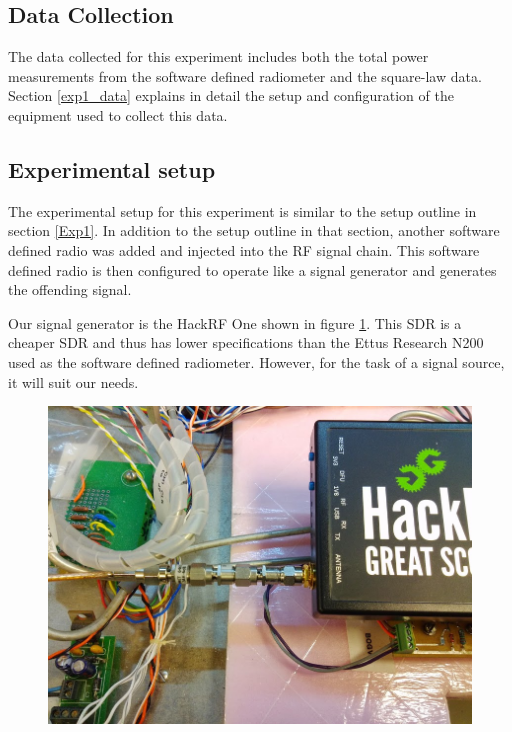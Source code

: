 \subsection{Data Collection}

The data collected for this experiment includes both the total power measurements from the software defined radiometer and the square-law data.  Section \ref{exp1_data} explains in detail the setup and configuration of the equipment used to collect this data.

\subsection{Experimental setup} \label{exp3_setup}

The experimental setup for this experiment is similar to the setup outline in section \ref{Exp1}.  In addition to the setup outline in that section, another software defined radio was added and injected into the RF signal chain.  This software defined radio is then configured to operate like a signal generator and generates the offending signal.  

Our signal generator is the HackRF One shown in figure \ref{HackRF}.  This SDR is a cheaper SDR and thus has lower specifications than the Ettus Research N200 used as the software defined radiometer.  However, for the task of a signal source, it will suit our needs.

\begin{figure}[h!tb] \centering

\includegraphics[width=\textwidth]{Images/Hack_RF.jpg}
\label{HackRF}
\end{figure} 

